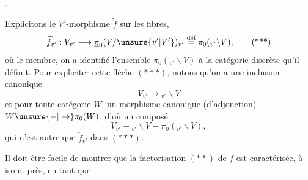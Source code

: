 
.

Explicitons le $V'$-morphisme $\widetilde f$ sur les
fibres,
\[
 \widetilde f_{v'}:V_{v'}\longrightarrow
 \underline{\pi}_0(V/\unsure{v'|V'})_{v'}\overset{\text{déf}}{=}\pi_0({}_{v'}\backslash V),\tag*{(***)}
\]
où  le  membre, on a identifié
l'ensemble $\pi_0({}_{v'}\backslash V)$ à la catégorie discrète
qu'il définit. Pour expliciter cette flèche
$(***)$, notons qu'on a une inclusion canonique
\[
 V_{v'}\longrightarrow{}_{v'}\backslash V
\]
et pour toute catégorie $W$, un morphisme
canonique (d'adjonction) $W\unsure{-|\to}\pi_0(W)$,
d'où un composé
\[
 V_{v'}-{}_{v'}\backslash V-\pi_0({}_{v'}\backslash V),
\]
qui n'est autre que $\widetilde f_{v'}$ dans $(***)$.

Il doit être facile de montrer que
la factorisation $(**)$ de $f$ est caractérisée,
à isom.  près,  en tant que

